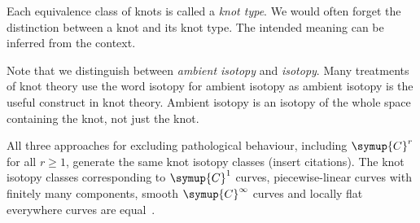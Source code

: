 \begin{remark}
    Each equivalence class of knots is called a \textit{knot type}. We would often forget the distinction between a knot and its knot type. The intended meaning can be inferred from the context.
\end{remark}

\begin{remark}
    Note that we distinguish between \textit{ambient isotopy} and \textit{isotopy}. Many treatments of knot theory use the word isotopy for ambient isotopy as ambient isotopy is the useful construct in knot theory. Ambient isotopy is an isotopy of the whole space containing the knot, not just the knot.
\end{remark}

\begin{remark}
    All three approaches for excluding pathological behaviour, including \(\symup{C}^r\) for all \(r \geq 1\), generate the same knot isotopy classes (insert citations). The knot isotopy classes corresponding to \(\symup{C}^1\) curves, piecewise-linear curves with finitely many components, smooth \(\symup{C}^\infty\) curves and locally flat everywhere curves are equal~\cite[chp.~1, \S~1.11]{cromwell}.
\end{remark}

